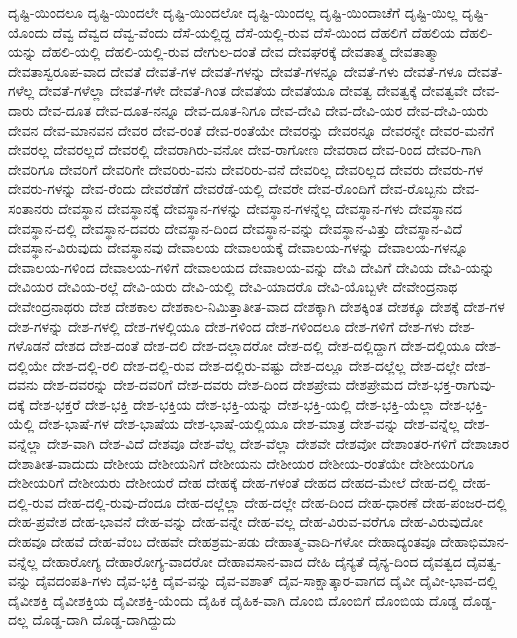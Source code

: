 {ದೃಷ್ಟಿ-ಯಿಂದಲೂ
ದೃಷ್ಟಿ-ಯಿಂದಲೇ
ದೃಷ್ಟಿ-ಯಿಂದಲೋ
ದೃಷ್ಟಿ-ಯಿಂದಲ್ಲ
ದೃಷ್ಟಿ-ಯಿಂದಾಚೆಗೆ
ದೃಷ್ಟಿ-ಯಿಲ್ಲ
ದೃಷ್ಟಿ-ಯೊಂದು
ದೆವ್ವ
ದೆವ್ವದ
ದೆವ್ವ-ವೆಂದು
ದೆಸೆ-ಯಲ್ಲಿದ್ದ
ದೆಸೆ-ಯಲ್ಲಿ-ರುವ
ದೆಸೆ-ಯಿಂದ
ದೆಹಲಿಗೆ
ದೆಹಲಿಯ
ದೆಹಲಿ-ಯನ್ನು
ದೆಹಲಿ-ಯಲ್ಲಿ
ದೆಹಲಿ-ಯಲ್ಲಿ-ರುವ
ದೇಗುಲ-ದಂತೆ
ದೇವ
ದೇವಘರಕ್ಕೆ
ದೇವತಾತ್ಮ
ದೇವತಾತ್ಮಾ
ದೇವತಾಸ್ವರೂಪ-ವಾದ
ದೇವತೆ
ದೇವತೆ-ಗಳ
ದೇವತೆ-ಗಳನ್ನು
ದೇವತೆ-ಗಳನ್ನೂ
ದೇವತೆ-ಗಳು
ದೇವತೆ-ಗಳೂ
ದೇವತೆ-ಗಳೆಲ್ಲ
ದೇವತೆ-ಗಳೆಲ್ಲಾ
ದೇವತೆ-ಗಳೇ
ದೇವತೆ-ಗಿಂತ
ದೇವತೆಯ
ದೇವತೆಯೂ
ದೇವತ್ವ
ದೇವತ್ವಕ್ಕೆ
ದೇವತ್ವವೇ
ದೇವ-ದಾರು
ದೇವ-ದೂತ
ದೇವ-ದೂತ-ನನ್ನೂ
ದೇವ-ದೂತ-ನಿಗೂ
ದೇವ-ದೇವಿ
ದೇವ-ದೇವಿ-ಯರ
ದೇವ-ದೇವಿ-ಯರು
ದೇವನ
ದೇವ-ಮಾನವನ
ದೇವರ
ದೇವ-ರಂತೆ
ದೇವ-ರಂತೆಯೇ
ದೇವರನ್ನು
ದೇವರನ್ನೂ
ದೇವರನ್ನೇ
ದೇವರ-ಮನೆಗೆ
ದೇವರಲ್ಲ
ದೇವರಲ್ಲದೆ
ದೇವರಲ್ಲಿ
ದೇವರಾಗಿರು-ವನೋ
ದೇವ-ರಾಗೋಣ
ದೇವರಾದ
ದೇವ-ರಿಂದ
ದೇವರಿ-ಗಾಗಿ
ದೇವರಿಗೂ
ದೇವರಿಗೆ
ದೇವರಿಗೇ
ದೇವರಿರು-ವನು
ದೇವರಿರು-ವನೆ
ದೇವರಿಲ್ಲ
ದೇವರಿಲ್ಲದ
ದೇವರು
ದೇವರು-ಗಳ
ದೇವರು-ಗಳನ್ನು
ದೇವ-ರೆಂದು
ದೇವರೆಡೆಗೆ
ದೇವರೆಡೆ-ಯಲ್ಲಿ
ದೇವರೇ
ದೇವ-ರೊಂದಿಗೆ
ದೇವ-ರೊಬ್ಬನು
ದೇವ-ಸಂತಾನರು
ದೇವಸ್ಥಾನ
ದೇವಸ್ಥಾನಕ್ಕೆ
ದೇವಸ್ಥಾನ-ಗಳನ್ನು
ದೇವಸ್ಥಾನ-ಗಳನ್ನೆಲ್ಲ
ದೇವಸ್ಥಾನ-ಗಳು
ದೇವಸ್ಥಾನದ
ದೇವಸ್ಥಾನ-ದಲ್ಲಿ
ದೇವಸ್ಥಾನ-ದವರು
ದೇವಸ್ಥಾನ-ದಿಂದ
ದೇವಸ್ಥಾನ-ವನ್ನು
ದೇವಸ್ಥಾನ-ವಿತ್ತು
ದೇವಸ್ಥಾನ-ವಿದೆ
ದೇವಸ್ಥಾನ-ವಿರುವುದು
ದೇವಸ್ಥಾನವು
ದೇವಾಲಯ
ದೇವಾಲಯಕ್ಕೆ
ದೇವಾಲಯ-ಗಳನ್ನು
ದೇವಾಲಯ-ಗಳನ್ನೂ
ದೇವಾಲಯ-ಗಳಿಂದ
ದೇವಾಲಯ-ಗಳಿಗೆ
ದೇವಾಲಯದ
ದೇವಾಲಯ-ವನ್ನು
ದೇವಿ
ದೇವಿಗೆ
ದೇವಿಯ
ದೇವಿ-ಯನ್ನು
ದೇವಿಯರ
ದೇವಿಯ-ರಲ್ಲೆ
ದೇವಿ-ಯರು
ದೇವಿ-ಯಲ್ಲಿ
ದೇವಿ-ಯಾದರೊ
ದೇವಿ-ಯೊಬ್ಬಳೇ
ದೇವೇಂದ್ರನಾಥ
ದೇವೇಂದ್ರನಾಥರು
ದೇಶ
ದೇಶಕಾಲ
ದೇಶಕಾಲ-ನಿಮಿತ್ತಾತೀತ-ವಾದ
ದೇಶಕ್ಕಾಗಿ
ದೇಶಕ್ಕಿಂತ
ದೇಶಕ್ಕೂ
ದೇಶಕ್ಕೆ
ದೇಶ-ಗಳ
ದೇಶ-ಗಳನ್ನು
ದೇಶ-ಗಳಲ್ಲಿ
ದೇಶ-ಗಳಲ್ಲಿಯೂ
ದೇಶ-ಗಳಿಂದ
ದೇಶ-ಗಳಿಂದಲೂ
ದೇಶ-ಗಳಿಗೆ
ದೇಶ-ಗಳು
ದೇಶ-ಗಳೊಡನೆ
ದೇಶದ
ದೇಶ-ದಂತೆ
ದೇಶ-ದಲಿ
ದೇಶ-ದಲ್ಲಾದರೋ
ದೇಶ-ದಲ್ಲಿ
ದೇಶ-ದಲ್ಲಿದ್ದಾಗ
ದೇಶ-ದಲ್ಲಿಯೂ
ದೇಶ-ದಲ್ಲಿಯೇ
ದೇಶ-ದಲ್ಲಿ-ರಲಿ
ದೇಶ-ದಲ್ಲಿ-ರುವ
ದೇಶ-ದಲ್ಲಿರು-ವಷ್ಟು
ದೇಶ-ದಲ್ಲೂ
ದೇಶ-ದಲ್ಲೆಲ್ಲ
ದೇಶ-ದಲ್ಲೇ
ದೇಶ-ದವನು
ದೇಶ-ದವರನ್ನು
ದೇಶ-ದವರಿಗೆ
ದೇಶ-ದವರು
ದೇಶ-ದಿಂದ
ದೇಶಪ್ರೇಮ
ದೇಶಪ್ರೇಮದ
ದೇಶ-ಭಕ್ತ-ರಾಗುವು-ದಕ್ಕೆ
ದೇಶ-ಭಕ್ತರೆ
ದೇಶ-ಭಕ್ತಿ
ದೇಶ-ಭಕ್ತಿಯ
ದೇಶ-ಭಕ್ತಿ-ಯನ್ನು
ದೇಶ-ಭಕ್ತಿ-ಯಲ್ಲಿ
ದೇಶ-ಭಕ್ತಿ-ಯೆಲ್ಲಾ
ದೇಶ-ಭಕ್ತಿ-ಯೆಲ್ಲಿ
ದೇಶ-ಭಾಷೆ-ಗಳ
ದೇಶ-ಭಾಷೆಯ
ದೇಶ-ಭಾಷೆ-ಯಲ್ಲಿಯೂ
ದೇಶ-ಮಾತ್ರ
ದೇಶ-ವನ್ನು
ದೇಶ-ವನ್ನೆಲ್ಲ
ದೇಶ-ವನ್ನೆಲ್ಲಾ
ದೇಶ-ವಾಗಿ
ದೇಶ-ವಿದೆ
ದೇಶವೂ
ದೇಶ-ವೆಲ್ಲ
ದೇಶ-ವೆಲ್ಲಾ
ದೇಶವೇ
ದೇಶವೋ
ದೇಶಾಂತರ-ಗಳಿಗೆ
ದೇಶಾಚಾರ
ದೇಶಾತೀತ-ವಾದುದು
ದೇಶೀಯ
ದೇಶೀಯನಿಗೆ
ದೇಶೀಯನು
ದೇಶೀಯರ
ದೇಶೀಯ-ರಂತೆಯೇ
ದೇಶೀಯರಿಗೂ
ದೇಶೀಯರಿಗೆ
ದೇಶೀಯರು
ದೇಶೀಯರೆ
ದೇಹ
ದೇಹಕ್ಕೆ
ದೇಹ-ಗಳಂತೆ
ದೇಹದ
ದೇಹದ-ಮೇಲೆ
ದೇಹ-ದಲ್ಲಿ
ದೇಹ-ದಲ್ಲಿ-ರುವ
ದೇಹ-ದಲ್ಲಿ-ರುವು-ದೆಂದೂ
ದೇಹ-ದಲ್ಲೆಲ್ಲಾ
ದೇಹ-ದಲ್ಲೇ
ದೇಹ-ದಿಂದ
ದೇಹ-ಧಾರಣೆ
ದೇಹ-ಪಂಜರ-ದಲ್ಲಿ
ದೇಹ-ಪ್ರವೇಶ
ದೇಹ-ಭಾವನೆ
ದೇಹ-ವನ್ನು
ದೇಹ-ವನ್ನೇ
ದೇಹ-ವಲ್ಲ
ದೇಹ-ವಿರುವ-ವರೆಗೂ
ದೇಹ-ವಿರುವುದೋ
ದೇಹವೂ
ದೇಹವೆ
ದೇಹ-ವೆಂಬ
ದೇಹವೇ
ದೇಹಶ್ರಮ-ಪಡು
ದೇಹಾತ್ಮ-ವಾದಿ-ಗಳೋ
ದೇಹಾದ್ಯಂತವೂ
ದೇಹಾಭಿಮಾನ-ವನ್ನೆಲ್ಲ
ದೇಹಾರೋಗ್ಯ
ದೇಹಾರೋಗ್ಯ-ವಾದರೋ
ದೇಹಾವಸಾನ-ವಾದ
ದೇಹಿ
ದೈನ್ಯತೆ
ದೈನ್ಯ-ದಿಂದ
ದೈವತ್ವದ
ದೈವತ್ವ-ವನ್ನು
ದೈವದಂಪತಿ-ಗಳು
ದೈವ-ಭಕ್ತಿ
ದೈವ-ವನ್ನು
ದೈವ-ವಶಾತ್
ದೈವ-ಸಾಕ್ಷಾತ್ಕಾರ-ವಾಗದ
ದೈವೀ
ದೈವೀ-ಭಾವ-ದಲ್ಲಿ
ದೈವೀಶಕ್ತಿ
ದೈವೀಶಕ್ತಿಯ
ದೈವೀಶಕ್ತಿ-ಯೆಂದು
ದೈಹಿಕ
ದೈಹಿಕ-ವಾಗಿ
ದೊಂಬಿ
ದೊಂಬಿಗೆ
ದೊಂಬಿಯ
ದೊಡ್ಡ
ದೊಡ್ಡ-ದಲ್ಲ
ದೊಡ್ಡ-ದಾಗಿ
ದೊಡ್ಡ-ದಾಗಿದ್ದುದು
}
